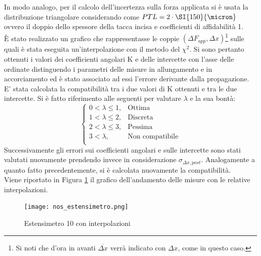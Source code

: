\documentclass[a4paper,11pt,oneside]{article}
\begin{document}
In modo analogo, per il calcolo dell'incertezza sulla forza applicata si è usata la distribuzione triangolare considerando come $PTL=2 \cdot \SI{150}{\micron}$ ovvero  il doppio dello spessore della tacca incisa e coefficienti di affidabilità 1.\\
È stato realizzato un grafico che rappresentasse le coppie $(\Delta F_{app}, \Delta x)$\footnote{Si noti che d'ora in avanti $\overline{\Delta x}$ verrà indicato con $\Delta x$, come in questo caso.} sulle quali è stata eseguita un'interpolazione con il metodo del $\chi^2$.
Si sono pertanto ottenuti i valori dei coefficienti angolari K e delle intercette con l'asse delle ordinate distinguendo i parametri delle misure in allungamento e in accorciamento ed è stato associato ad essi l'errore derivante dalla propagazione.\\
E' stata calcolata la compatibilità tra i due valori di K ottenuti e tra le due intercette. Si è fatto riferimento alle seguenti per valutare $\lambda$ e la sua bontà:
\begin{equation*}%
    \label{eq:cases}
    \begin{cases}
    0<\lambda\leq 1, & \text{Ottima}\\
    1<\lambda\leq2, & \text{Discreta}\\
    2<\lambda\leq3, & \text{Pessima}\\
    3<\lambda, & \text{Non compatibile}\\
    \end{cases}
\end{equation*}
Successivamente gli errori sui coefficienti angolari e sulle intercette sono stati valutati nuovamente prendendo invece in considerazione $\sigma_{\Delta x, post}$. Analogamente a quanto fatto precedentemente, si è calcolata nuovamente la compatibilità.\\
Viene riportato in Figura \ref{fig:nos_estensimetro.png} il grafico dell'andamento delle misure con le relative interpolazioni.

\begin{figure}[h!]
    \centering
        \caption{Estensimetro 10 con interpolazioni}
        \label{fig:nos_estensimetro.png}
        \texttt{[image: nos\_estensimetro.png]}
\end{figure}
\end{document}
